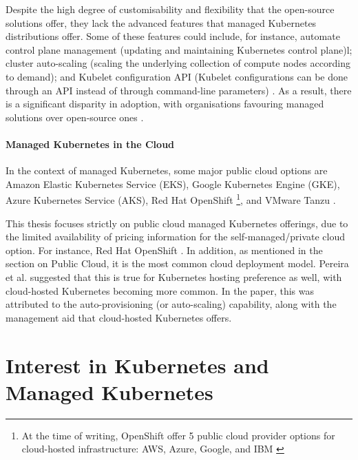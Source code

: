 Despite the high degree of customisability and flexibility that the open-source solutions offer, they lack the advanced features that managed Kubernetes distributions offer. Some of these features could include, for instance, automate control plane management (updating and maintaining Kubernetes control plane)l; cluster auto-scaling (scaling the underlying collection of compute nodes according to demand); and Kubelet configuration API (Kubelet configurations can be done through an API instead of through command-line parameters) \cite{truyenManagingFeatureCompatibility2020, KubeletConfigMachineconfigurationopenshiftioV1, AmazonEKSCustomers, RedHatOpenShiftb}. As a result, there is a significant disparity in adoption, with organisations favouring managed solutions over open-source ones \cite{redhatinc.StateKubernetesSecurity2024}.

\paragraph{Managed Kubernetes in the Cloud}\mbox{}

In the context of managed Kubernetes, some major public cloud options are Amazon Elastic Kubernetes Service (EKS), Google Kubernetes Engine (GKE), Azure Kubernetes Service (AKS), Red Hat OpenShift \footnote{At the time of writing, OpenShift offer 5 public cloud provider options for cloud-hosted infrastructure: AWS, Azure, Google, and IBM \cite{OpenShiftContainerPlatform}}, and VMware Tanzu \cite{AmazonEKSCustomers, maEurekaHumanLevelReward2023, nickomangAzureKubernetesService, redhatinc.RedHatOpenShift, VMwareTanzuPlatform}.

This thesis focuses strictly on public cloud managed Kubernetes offerings, due to the limited availability of pricing information for the self-managed/private cloud option. For instance, Red Hat OpenShift \cite{redhatinc.RedHatOpenShift}. In addition, as mentioned in the section on Public Cloud, it is the most common cloud deployment model. Pereira et al. \cite{pereiraferreiraPerformanceEvaluationContainers2019} suggested that this is true for Kubernetes hosting preference as well, with cloud-hosted Kubernetes becoming more common. In the paper, this was attributed to the auto-provisioning (or auto-scaling) capability, along with the management aid that cloud-hosted Kubernetes offers.

\section{Interest in Kubernetes and Managed Kubernetes}

